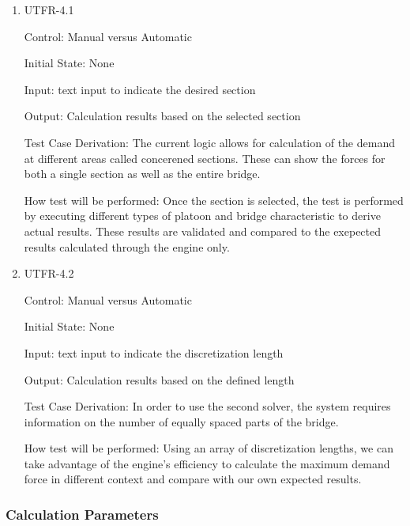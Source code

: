 \documentclass[12pt, titlepage]{article}
\begin{document}
\begin{enumerate}

\item{UTFR-4.1\\}

Control: Manual versus Automatic
					
Initial State: None
					
Input: text input to indicate the desired section 
					
Output: Calculation results based on the selected section

Test Case Derivation: The current logic allows for calculation of the demand at different areas called concerened sections. These can show the forces for both a single section as well as the entire bridge. 

How test will be performed: Once the section is selected, the test is performed by executing different types of platoon and bridge characteristic to derive actual results. These results are validated and compared to the exepected results calculated through the engine only. 
					
\item{UTFR-4.2\\}

Control: Manual versus Automatic
					
Initial State: None
					
Input: text input to indicate the discretization length 
					
Output: Calculation results based on the defined length

Test Case Derivation: In order to use the second solver, the system requires information on the number of equally spaced parts of the bridge. 

How test will be performed: Using an array of discretization lengths, we can take advantage of the engine's efficiency to calculate the maximum demand force in different context and compare with our own expected results. 

\end{enumerate}


\subsubsection{Calculation Parameters}
\end{document}
